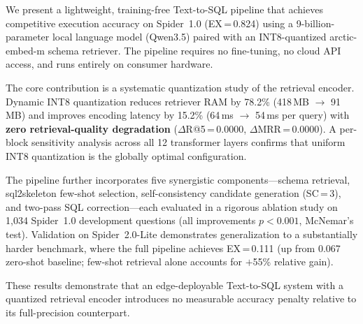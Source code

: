 We present a lightweight, training-free Text-to-SQL pipeline that achieves
competitive execution accuracy on Spider~1.0 (\mbox{EX\,=\,0.824}) using a
9-billion-parameter local language model (Qwen3.5) paired with an
INT8-quantized arctic-embed-m schema retriever.
The pipeline requires no fine-tuning, no cloud API access, and runs entirely
on consumer hardware.

The core contribution is a systematic quantization study of the retrieval
encoder.
Dynamic INT8 quantization reduces retriever RAM by 78.2\% (418\,MB
$\to$ 91\,MB) and improves encoding latency by 15.2\% (64\,ms
$\to$ 54\,ms per query) with \textbf{zero retrieval-quality degradation}
($\Delta$R@5\,=\,0.0000, $\Delta$MRR\,=\,0.0000).
A per-block sensitivity analysis across all 12 transformer layers confirms
that uniform INT8 quantization is the globally optimal configuration.

The pipeline further incorporates five synergistic components---schema
retrieval, sql2skeleton few-shot selection, self-consistency candidate
generation (SC\,=\,3), and two-pass SQL correction---each evaluated in a
rigorous ablation study on 1{,}034 Spider~1.0 development questions
(all improvements $p < 0.001$, McNemar's test).
Validation on Spider~2.0-Lite demonstrates generalization to a
substantially harder benchmark, where the full pipeline achieves
EX\,=\,0.111 (up from 0.067 zero-shot baseline; few-shot retrieval
alone accounts for $+$55\% relative gain).

These results demonstrate that an edge-deployable Text-to-SQL system
with a quantized retrieval encoder introduces no measurable accuracy
penalty relative to its full-precision counterpart.
